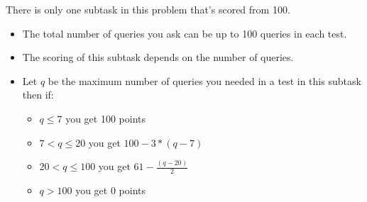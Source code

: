 There is only one subtask in this problem that's scored from 100.

\begin{itemize}
\item The total number of queries you ask can be up to 100 queries in each test.
\item The scoring of this subtask depends on the number of queries.
\item Let $q$ be the maximum number of queries you needed in a test in this subtask then if:
\begin{itemize}
\item $q \le 7$ you get 100 points
\item $7 < q \le 20$ you get $100 - 3*(q-7)$
\item $20 < q \le 100$ you get $61 - \frac{(q-20)}{2}$
\item $q > 100$ you get 0 points
\end{itemize}
\end{itemize}

